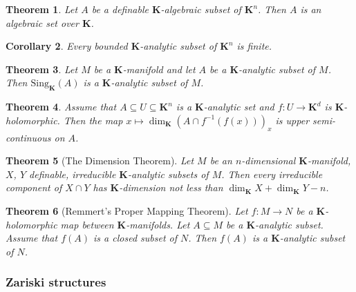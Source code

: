 \documentclass{amsart}
\newtheorem{theorem}{Theorem}[subsection]
\newtheorem{corollary}[theorem]{Corollary}
\theoremstyle{definition}
\numberwithin{equation}{section}
\begin{document}
\begin{tcolorbox}[title = {Definable Chow's Theorem}]
\begin{theorem}
  Let $A$ be a definable $\mathbf{K}$-algebraic subset of $\mathbf{K}^n$.
  Then $A$ is an algebraic set over $\mathbf{K}$.
\end{theorem}
\end{tcolorbox}

\begin{corollary}
  Every bounded $\mathbf{K}$-analytic subset of $\mathbf{K}^n$ is finite.
\end{corollary}

\begin{tcolorbox}
  \begin{theorem}
    Let $M$ be a $\mathbf{K}$-manifold and let $A$ be a $\mathbf{K}$-analytic subset of $M$.
    Then $\mathrm{Sing}_{\mathbf{K}}(A)$ is a $\mathbf{K}$-analytic subset of $M$.
  \end{theorem}
\end{tcolorbox}

\begin{theorem}
  Assume that $A \subseteq U \subseteq \mathbf{K}^n$ is a $\mathbf{K}$-analytic set and $f: U \to \mathbf{K}^d$ is $\mathbf{K}$-holomorphic.
  Then the map $x\mapsto \dim_{\mathbf{K}}(A\cap f^{-1}(f(x)))_x$ is upper semi-continuous on $A$.
\end{theorem}

\begin{theorem}[The Dimension Theorem]
  Let $M$ be an $n$-dimensional \hspace{0em}
  $\mathbf{K}$-manifold,
  $X$, $Y$ definable, irreducible $\mathbf{K}$-analytic subsets of $M$.
  Then every irreducible component of $X \cap Y$ has $\mathbf{K}$-dimension not less than $\dim_{\mathbf{K}}X + \dim_{\mathbf{K}}Y - n$.
\end{theorem}

\begin{theorem}[Remmert's Proper Mapping Theorem]
  Let $f: M \to N$ be a $\mathbf{K}$-holomorphic map between $\mathbf{K}$-manifolds.
  Let $A \subseteq M$ be a $\mathbf{K}$-analytic subset.
  Assume that $f(A)$ is a closed subset of $N$.
  Then $f(A)$ is a $\mathbf{K}$-analytic subset of $N$.
\end{theorem}

\subsubsection{Zariski structures}
\end{document}
